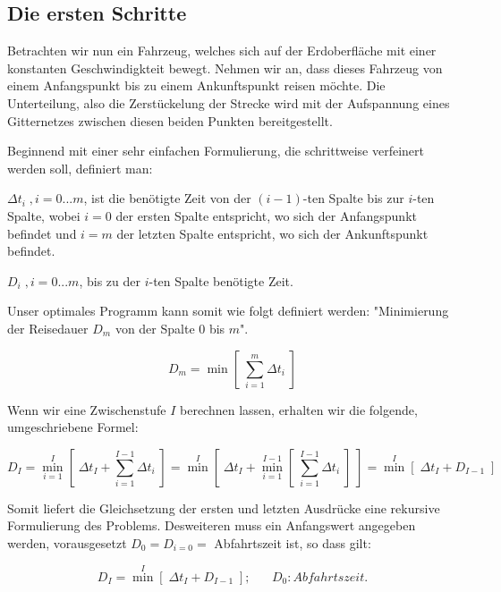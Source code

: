 \documentclass[a4paper,10pt]{article}
\begin{document}
\subsection{Die ersten Schritte}
Betrachten wir nun ein Fahrzeug, welches sich auf der Erdoberfläche mit
einer konstanten Geschwindigkteit bewegt. Nehmen wir an, dass dieses
Fahrzeug von einem Anfangspunkt bis zu einem Ankunftspunkt reisen
möchte. Die Unterteilung, also die Zerstückelung der Strecke wird mit
der Aufspannung eines Gitternetzes zwischen diesen beiden Punkten
bereitgestellt.

Beginnend mit einer sehr einfachen Formulierung, die schrittweise verfeinert
werden soll, definiert man:

\( \Delta t_i\;,  i=0...m\), ist die benötigte Zeit von der \( (i-1)\)-ten
Spalte bis zur \(i\)-ten Spalte, wobei \(i=0\) der ersten Spalte entspricht,
wo sich der Anfangspunkt befindet und \(i=m\) der letzten Spalte entspricht,
wo sich der Ankunftspunkt befindet.


\( D_i\;,  i=0...m\), bis zu der \(i\)-ten Spalte benötigte Zeit.

Unser optimales Programm kann somit wie folgt definiert werden: "Minimierung
der Reisedauer \(D_m\) von der Spalte \(0\) bis \(m\)". 

\begin{equation}
\label{eq_dyn:1}
D_m = \min [\; \sum_{i=1}^m \Delta t_i\;]
 \end{equation}

Wenn wir eine Zwischenstufe \(I\) berechnen lassen, erhalten wir die
folgende, umgeschriebene Formel:

\begin{equation}
\label{eq_dyn:2}
D_I = \overset{I}{\underset{i=1}{\min}} [\; \Delta t_I + \sum_{i=1}^{I-1}
\Delta t_i\;] = \overset{I}{\min} [\; \Delta t_I +
\overset{I-1}{\underset{i=1}{\min}} [\; \sum_{i=1}^{I-1} \Delta t_i\;]\;] =
\overset{I}{\min} [\; \Delta t_I + D_{I-1} \;]
\end{equation}

Somit liefert die Gleichsetzung der ersten und letzten Ausdrücke eine rekursive
Formulierung des Problems. Desweiteren muss ein Anfangswert angegeben werden,
vorausgesetzt \(D_0  = D_{i=0} =\) Abfahrtszeit ist, so dass gilt:
 
 \begin{equation}
\label{eq_dyn:3}
D_I =  \overset{I}{\min} [\; \Delta t_I + D_{I-1} \;];\;\;\;\;\;\; D_0: Abfahrtszeit.
 \end{equation}
 
\end{document}
